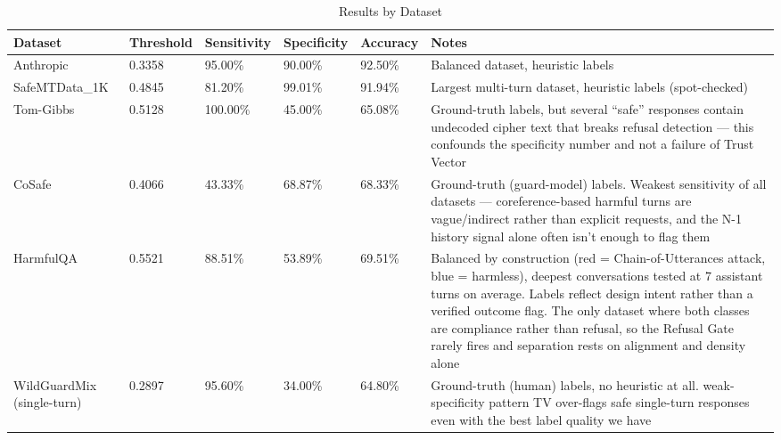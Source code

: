 \documentclass[conference]{IEEEtran}
\begin{document}
\begin{table}[htbp]
\centering
\caption{Results by Dataset}
 \label{tab:results_data}
\begin{tabularx}{\linewidth}{l l l l l X}
\toprule
\textbf{Dataset} & \textbf{Threshold} & \textbf{Sensitivity} & \textbf{Specificity} & \textbf{Accuracy} & \textbf{Notes} \\
\midrule
Anthropic & 0.3358 & 95.00\% & 90.00\% & 92.50\% & Balanced dataset, heuristic labels \\
SafeMTData\_1K & 0.4845 & 81.20\% & 99.01\% & 91.94\% & Largest multi-turn dataset, heuristic labels (spot-checked) \\
Tom-Gibbs & 0.5128 & 100.00\% & 45.00\% & 65.08\% & Ground-truth labels, but several ``safe'' responses contain undecoded cipher text that breaks refusal detection — this confounds the specificity number and not a failure of Trust Vector \\
CoSafe & 0.4066 & 43.33\% & 68.87\% & 68.33\% & Ground-truth (guard-model) labels. Weakest sensitivity of all datasets — coreference-based harmful turns are vague/indirect rather than explicit requests, and the N-1 history signal alone often isn't enough to flag them \\
HarmfulQA & 0.5521 & 88.51\% & 53.89\% & 69.51\% & Balanced by construction (red = Chain-of-Utterances attack, blue = harmless), deepest conversations tested at 7 assistant turns on average. Labels reflect design intent rather than a verified outcome flag. The only dataset where both classes are compliance rather than refusal, so the Refusal Gate rarely fires and separation rests on alignment and density alone \\
WildGuardMix (single-turn) & 0.2897 & 95.60\% & 34.00\% & 64.80\% & Ground-truth (human) labels, no heuristic at all. weak-specificity pattern TV over-flags safe single-turn responses even with the best label quality we have \\
\bottomrule
\end{tabularx}
\end{table}


\end{document}
